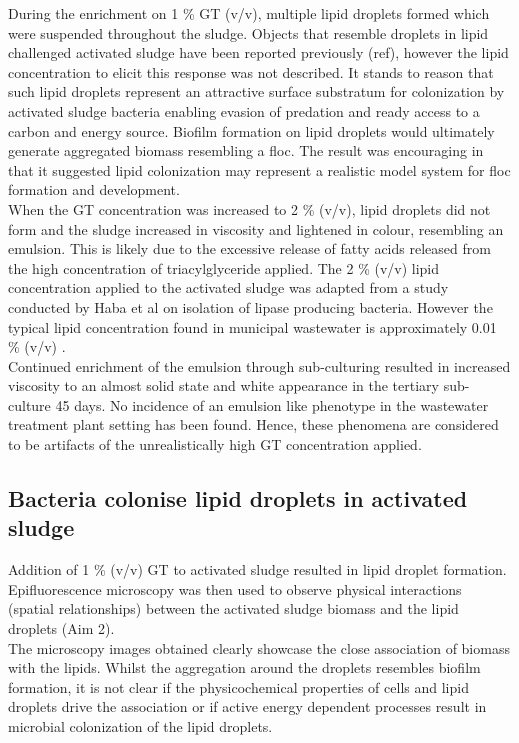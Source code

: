 \documentclass[twoside]{article}
\begin{document}
During the enrichment on 1 \% GT (v/v), multiple lipid droplets formed which were suspended throughout the sludge. Objects that resemble droplets in lipid challenged activated sludge have been reported previously (ref), however the lipid concentration to elicit this response was not described. It stands to reason that such lipid droplets represent an attractive surface substratum for colonization by activated sludge bacteria enabling evasion of predation and ready access to a carbon and energy source. Biofilm formation on lipid droplets would ultimately generate aggregated biomass resembling a floc. The result was encouraging in that it suggested lipid colonization may represent a realistic model system for floc formation and development. \\

When the GT concentration was increased to 2 \% (v/v), lipid droplets did not form and the sludge increased in viscosity and lightened in colour, resembling an emulsion. This is likely due to the excessive release of fatty acids released from the high concentration of triacylglyceride applied. The 2 \% (v/v) lipid concentration applied to the activated sludge was adapted from a study conducted by Haba et al \cite{haba2000isolation} on isolation of lipase producing bacteria. However the typical lipid concentration found in municipal wastewater is approximately 0.01 \% (v/v) \cite{Forster_92}. \\

Continued enrichment of the emulsion through sub-culturing resulted in increased viscosity to an almost solid state and white appearance in the tertiary sub-culture 45 days. No incidence of an emulsion like phenotype in the wastewater treatment plant setting has been found. Hence, these phenomena are considered to be artifacts of the unrealistically high GT concentration applied.

\subsection{Bacteria colonise lipid droplets in activated sludge}
Addition of 1 \% (v/v) GT to activated sludge resulted in lipid droplet formation. Epifluorescence microscopy was then used to observe physical interactions (spatial relationships) between the activated sludge biomass and the lipid droplets (Aim 2). \\

The microscopy images obtained clearly showcase the close association of biomass with the lipids. Whilst the aggregation around the droplets resembles biofilm formation, it is not clear if the physicochemical properties of cells and lipid droplets drive the association or if active energy dependent processes result in microbial colonization of the lipid droplets. \\
\end{document}

